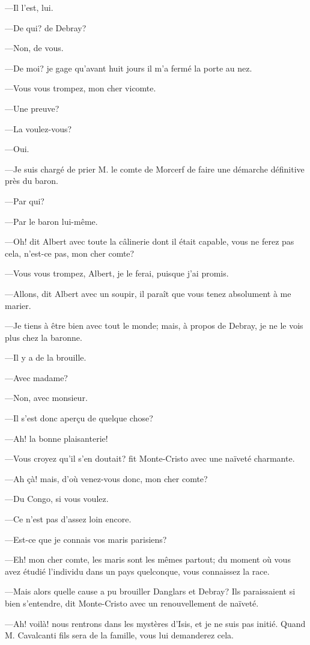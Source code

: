 —Il l'est, lui. 

—De qui? de Debray? 

—Non, de vous. 

—De moi? je gage qu'avant huit jours il m'a fermé la porte au nez. 

—Vous vous trompez, mon cher vicomte. 

—Une preuve? 

—La voulez-vous? 

—Oui. 

—Je suis chargé de prier M. le comte de Morcerf de faire une démarche définitive près du baron. 

—Par qui? 

—Par le baron lui-même. 

—Oh! dit Albert avec toute la câlinerie dont il était capable, vous ne ferez pas cela, n'est-ce pas, mon cher comte? 

—Vous vous trompez, Albert, je le ferai, puisque j'ai promis. 

—Allons, dit Albert avec un soupir, il paraît que vous tenez absolument à me marier. 

—Je tiens à être bien avec tout le monde; mais, à propos de Debray, je ne le vois plus chez la baronne. 

—Il y a de la brouille. 

—Avec madame? 

—Non, avec monsieur. 

—Il s'est donc aperçu de quelque chose? 

—Ah! la bonne plaisanterie! 

—Vous croyez qu'il s'en doutait? fit Monte-Cristo avec une naïveté charmante. 

—Ah çà! mais, d'où venez-vous donc, mon cher comte? 

—Du Congo, si vous voulez. 

—Ce n'est pas d'assez loin encore. 

—Est-ce que je connais vos maris parisiens? 

—Eh! mon cher comte, les maris sont les mêmes partout; du moment où vous avez étudié l'individu dans un pays quelconque, vous connaissez la race. 

—Mais alors quelle cause a pu brouiller Danglars et Debray? Ils paraissaient si bien s'entendre, dit Monte-Cristo avec un renouvellement de naïveté. 

—Ah! voilà! nous rentrons dans les mystères d'Isis, et je ne suis pas initié. Quand M. Cavalcanti fils sera de la famille, vous lui demanderez cela. 

